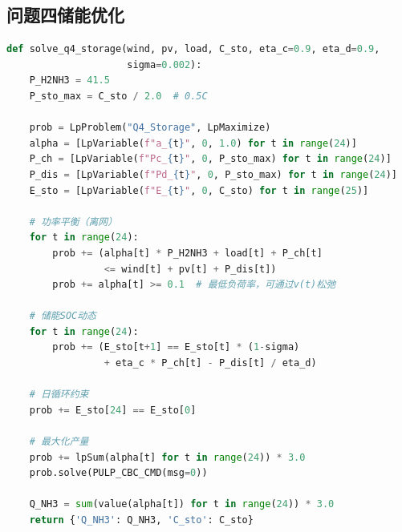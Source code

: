 \subsection{问题四储能优化}
\begin{lstlisting}[language=Python, basicstyle=\ttfamily\small, breaklines=true]
def solve_q4_storage(wind, pv, load, C_sto, eta_c=0.9, eta_d=0.9,
                     sigma=0.002):
    P_H2NH3 = 41.5
    P_sto_max = C_sto / 2.0  # 0.5C
    
    prob = LpProblem("Q4_Storage", LpMaximize)
    alpha = [LpVariable(f"a_{t}", 0, 1.0) for t in range(24)]
    P_ch = [LpVariable(f"Pc_{t}", 0, P_sto_max) for t in range(24)]
    P_dis = [LpVariable(f"Pd_{t}", 0, P_sto_max) for t in range(24)]
    E_sto = [LpVariable(f"E_{t}", 0, C_sto) for t in range(25)]
    
    # 功率平衡（离网）
    for t in range(24):
        prob += (alpha[t] * P_H2NH3 + load[t] + P_ch[t] 
                 <= wind[t] + pv[t] + P_dis[t])
        prob += alpha[t] >= 0.1  # 最低负荷率，可通过v(t)松弛
    
    # 储能SOC动态
    for t in range(24):
        prob += (E_sto[t+1] == E_sto[t] * (1-sigma) 
                 + eta_c * P_ch[t] - P_dis[t] / eta_d)
    
    # 日循环约束
    prob += E_sto[24] == E_sto[0]
    
    # 最大化产量
    prob += lpSum(alpha[t] for t in range(24)) * 3.0
    prob.solve(PULP_CBC_CMD(msg=0))
    
    Q_NH3 = sum(value(alpha[t]) for t in range(24)) * 3.0
    return {'Q_NH3': Q_NH3, 'C_sto': C_sto}
\end{lstlisting}
